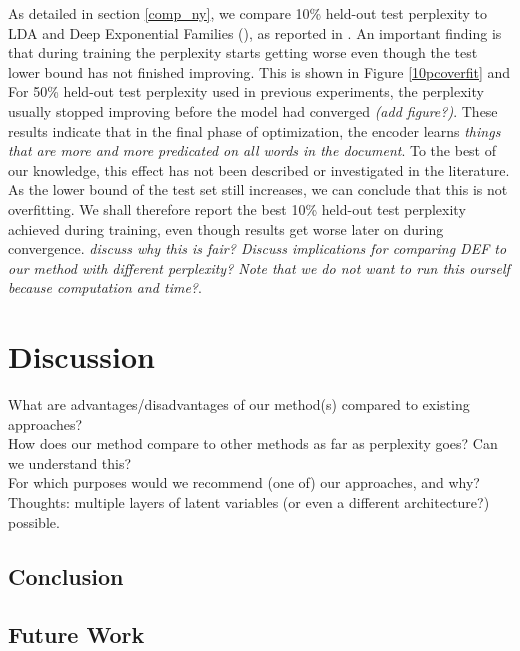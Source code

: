 \documentclass{report}
\begin{document}
As detailed in section \ref{comp_ny}, we compare 10\% held-out test perplexity to LDA \cite{blei2003latent} and Deep Exponential Families (\cite{ranganath2015deep}), as reported in \cite{ranganath2015deep}. An important finding is that during training the perplexity starts getting worse even though the test lower bound has not finished improving. This is shown in Figure \ref{10pcoverfit} and  For 50\% held-out test perplexity used in previous experiments, the perplexity usually stopped improving before the model had converged \textit{(add figure?)}. These results indicate that in the final phase of optimization, the encoder learns \textit{things that are more and more predicated on all words in the document}. To the best of our knowledge, this effect has not been described or investigated in the literature. \\
As the lower bound of the test set still increases, we can conclude that this is not overfitting. We shall therefore report the best 10\% held-out test perplexity achieved during training, even though results get worse later on during convergence. \textit{discuss why this is fair? Discuss implications for comparing DEF to our method with different perplexity? Note that we do not want to run this ourself because computation and time?}.



		
\chapter{Discussion}
What are advantages/disadvantages of our method(s) compared to existing approaches?\\
How does our method compare to other methods as far as perplexity goes? Can we understand this?\\
For which purposes would we recommend (one of) our approaches, and why? \\
Thoughts: multiple layers of latent variables (or even a different architecture?) possible.
\section{Conclusion}
\section{Future Work}

\end{document}

